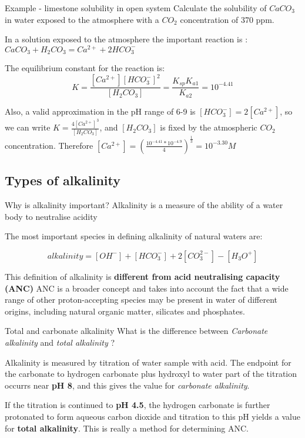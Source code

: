 \documentclass[a4paper,titlepage]{article}
\begin{document}
\begin{frame}
\begin{exampleblock}{Example - limestone solubility in open system}
Calculate the solubility of \(CaCO_3\) in water exposed to the
atmosphere with a \(CO_2\) concentration of 370 ppm.

\smallskip In a solution exposed to the atmosphere the important reaction is :
\(CaCO_3 + H_2CO_3 = Ca^{2+} + 2HCO_3^-\)

\smallskip The equilibrium constant for the reaction is:
\[K = \frac{[Ca^{2+}][HCO_3^-]^2}{[H_2CO_3]} = \frac{K_{sp}K_{a1}}{K_{a2}} = 10^{-4.41}\]

Also, a valid approximation in the pH range of 6-9 is
\([HCO_3^-] = 2[Ca^{2+}]\), so we can
write \(K=\frac{4[Ca^{2+}]^3}{[H_2CO_3]}\), \quad and \([H_2CO_3]\) is fixed by
the atmospheric \(CO_2\) concentration. Therefore \([Ca^{2+}] =
\left(\frac{10^{-4.41} * 10^{-4.9}}{4}\right)^\frac{1}{3} = 10^{-3.30} M\)
\end{exampleblock}
\end{frame}

\subsection{Types of alkalinity}
\begin{frame}{Why is alkalinity important?}
Alkalinity is a measure of the ability of a water body to neutralise
acidity

\medskip The most important species in defining alkalinity of natural waters are:

\[alkalinity = [OH^-] + [HCO_3^-] + 2[CO_3^{2-}] - [H_3O^+]\]

\medskip This definition of alkalinity is \textbf{different from acid neutralising capacity (ANC)} ANC 
is a broader concept and takes into account the fact that a
wide range of other proton-accepting species may be present in water of
different origins, including natural organic matter, silicates and
phosphates.
\end{frame}

\begin{frame}{Total and carbonate alkalinity}
What is the difference between \emph{Carbonate alkalinity} and
\emph{total alkalinity} ? 

\medskip Alkalinity is measured by titration of water
sample with acid. The endpoint for the carbonate to hydrogen carbonate
plus hydroxyl to water part of the titration occurrs near \textbf{pH 8}, and this
gives the value for \textit{carbonate alkalinity}. 

\medskip If the titration is
continued to \textbf{pH 4.5}, the hydrogen carbonate is further protonated to
form aqueous carbon dioxide and titration to this pH yields a value for
\textbf{total alkalinity}. This is really a method for determining ANC.
\end{frame}
\end{document}
